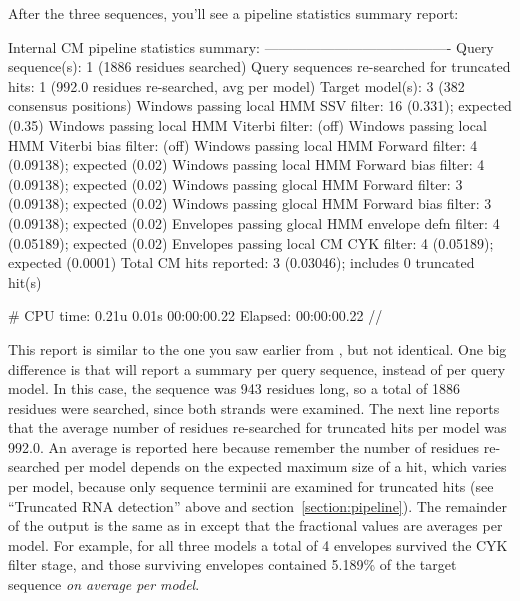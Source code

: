 After the three sequences, you'll see a pipeline statistics summary
report:

\begin{widesreoutput}
Internal CM pipeline statistics summary:
----------------------------------------
Query sequence(s):                                               1  (1886 residues searched)
Query sequences re-searched for truncated hits:                  1  (992.0 residues re-searched, avg per model)
Target model(s):                                                 3  (382 consensus positions)
Windows   passing  local HMM SSV           filter:              16  (0.331); expected (0.35)
Windows   passing  local HMM Viterbi       filter:                  (off)
Windows   passing  local HMM Viterbi  bias filter:                  (off)
Windows   passing  local HMM Forward       filter:               4  (0.09138); expected (0.02)
Windows   passing  local HMM Forward  bias filter:               4  (0.09138); expected (0.02)
Windows   passing glocal HMM Forward       filter:               3  (0.09138); expected (0.02)
Windows   passing glocal HMM Forward  bias filter:               3  (0.09138); expected (0.02)
Envelopes passing glocal HMM envelope defn filter:               4  (0.05189); expected (0.02)
Envelopes passing  local CM  CYK           filter:               4  (0.05189); expected (0.0001)
Total CM hits reported:                                          3  (0.03046); includes 0 truncated hit(s)

# CPU time: 0.21u 0.01s 00:00:00.22 Elapsed: 00:00:00.22
//
\end{widesreoutput}

This report is similar to the one you saw earlier from
, but not identical. One big difference is that
 will report a summary per query sequence, instead of per
query model. In this case, the sequence was 943 residues long, so a
total of 1886 residues were searched, since both strands were
examined. The next line reports that the average number of residues
re-searched for truncated hits per model was 992.0. An average is
reported here because remember the number of residues re-searched per
model depends on the expected maximum size of a hit, which varies per
model, because only sequence terminii are examined for truncated hits
(see ``Truncated RNA detection'' above and
section~\ref{section:pipeline}).  The remainder of the output is the
same as in  except that the fractional values are
averages per model. For example, for all three models a total of 4
envelopes survived the CYK filter stage, and those surviving envelopes
contained 5.189\% of the target sequence \emph{on average per model}.

